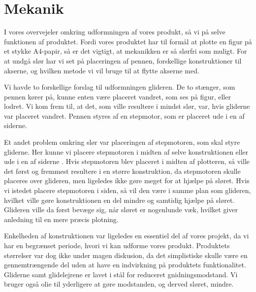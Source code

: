 \chapter[Design af mekanik]{Mekanik}


I vores overvejeler omkring udformningen af vores produkt, så vi på
selve funktionen af produktet. Fordi vores produktet har til formål at
plotte en figur på et stykke A4-papir, så er det vigtigt, at
mekanikken er så slørfri som muligt. For at undgå slør har vi set på
placeringen af pennen, forskellige konstruktioner til akserne, og
hvilken metode vi vil bruge til at flytte akserne med.

Vi havde to forskellige forslag til udformningen glideren. De to
stænger, som pennen kører på, kunne enten være placeret vandret, som
ses på figur, eller lodret. Vi kom frem
til, at det, som ville resultere i mindst slør, var, hvis gliderne var
placeret vandret. Pennen styres af en stepmotor, som er placeret ude i
en af siderne.

Et andet problem omkring slør var placeringen af stepmotoren, som skal
styre gliderne. Her kunne vi placere stepmotoren i midten af selve
konstruktionen eller ude i en af siderne . Hvis
stepmotoren blev placeret i midten af plotteren, så ville det først og
fremmest resultere i en større konstruktion, da stepmotoren skulle
placeres over glideren, men ligeledes ikke gøre meget for at hjælpe på
sløret. Hvis vi istedet placere stepmotoren i siden, så vil den være i
samme plan som glideren, hvilket ville gøre konstruktionen en del
mindre og samtidig hjælpe på sløret. Glideren ville da først bevæge sig,
når sløret er nogenlunde væk, hvilket giver anledning til en mere
præcis plotning.

Enkelheden af konstruktionen var ligeledes en essentiel del af vores
projekt, da vi har en begrænset periode, hvori vi kan udforme vores
produkt. Produktets størrelser var dog ikke under magen diskusion, da
det simplistiske skulle være en gennemtrængende del uden at have en
indvirkning på produktets funktionalitet. Gliderne samt glidelejrene er
lavet i stål for reduceret gnidningsmodstand. Vi bruger også olie til
yderligere at gøre modstanden, og derved sløret, mindre.


